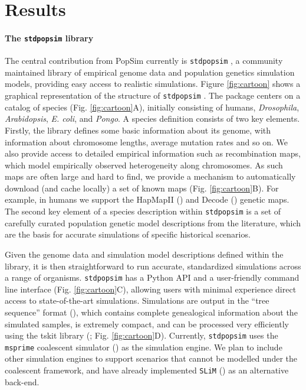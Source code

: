 \documentclass[12pt,halfline,a4paper]{ouparticle}
\newcommand{\stdpopsim}{\texttt{stdpopsim} }
\begin{document}
\section*{Results}
\paragraph{The \stdpopsim library}
The central contribution from PopSim currently is \stdpopsim, a community
maintained library of empirical genome data and population genetics simulation
models, providing easy access to realistic simulations. Figure \ref{fig:cartoon} shows a graphical
representation of the structure of \stdpopsim. The package centers
on a catalog of species (Fig. \ref{fig:cartoon}A), initially consisting of humans, \emph{Drosophila},
\emph{Arabidopsis}, \emph{E. coli}, and \emph{Pongo}. A species definition consists
of two key elements.  Firstly, the library defines
some basic information about its genome, with information about chromosome
lengths, average mutation rates and so on. We also provide access to detailed
empirical information such as recombination maps, which model empirically
observed heterogeneity along chromosomes. As such maps are often large and hard
to find, we provide a mechanism to automatically download (and cache locally) a
set of known maps (Fig. \ref{fig:cartoon}B). For example, in humans we support the HapMapII (\cite{international2007second}) and
Decode (\cite{kong2010fine}) genetic maps. The second key element of a species description
within \stdpopsim is a set of carefully curated population genetic model
descriptions from the literature, which are the basis for accurate simulations
of specific historical scenarios.

Given the genome data and simulation model descriptions defined within the
library, it is then straightforward to run accurate, standardized simulations
across a range of organisms. \stdpopsim has a Python API and a user-friendly
command line interface (Fig. \ref{fig:cartoon}C), allowing users with minimal experience direct access to
state-of-the-art simulations. Simulations are output in the “tree sequence”
format (\cite{kelleher2016efficient,kelleher2018efficient,kelleher2019inferring}), which
contains complete genealogical information about the simulated samples, is
extremely compact, and can be processed very efficiently using the tskit library
(\cite{kelleher2016efficient,kelleher2018efficient}; Fig. \ref{fig:cartoon}D). Currently,
\stdpopsim uses the  \texttt{msprime} coalescent simulator (\cite{kelleher2016efficient})
as the simulation engine. We plan to include other simulation
engines to support scenarios that cannot be modelled under the coalescent framework,
and have already implemented \texttt{SLiM} (\cite{haller2019slim}) as
an alternative back-end.
\end{document}
